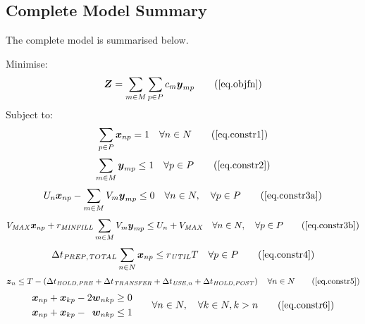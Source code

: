 \subsection{Complete Model Summary}\label{SS.completesummary}

The complete model is summarised below.

Minimise:
\begin{equation}
    \boldsymbol{Z} = \sum_{m \in M} \sum_{p \in P} c_m \boldsymbol{y}_{mp}
    \tag{\ref{eq.objfn}}
\end{equation}
Subject to:
\begin{equation}
    \sum_{p \in P} \boldsymbol{x}_{np} = 1 \quad \forall n \in N
    \tag{\ref{eq.constr1}}
\end{equation}
\begin{equation}
    \sum_{m \in M} \boldsymbol{y}_{mp} \le 1 \quad \forall p \in P
    \tag{\ref{eq.constr2}}
\end{equation}
\begin{equation}
    U_{n} \boldsymbol{x}_{np} - \sum_{m \in M} V_{m} \boldsymbol{y}_{mp} \le 0
    \quad \forall n \in N, \quad \forall p \in P
    \tag{\ref{eq.constr3a}}
\end{equation}
\begin{equation}
    V_{\mathit{MAX}} \boldsymbol{x}_{np} + r_{\mathit{MINFILL}} \sum_{m \in M}
    V_{m} \boldsymbol{y}_{mp} \le U_{n} + V_{\mathit{MAX}} \quad \forall n \in
    N, \quad \forall p \in P
    \tag{\ref{eq.constr3b}}
\end{equation}
\begin{equation}
    \Delta t_{\mathit{PREP,TOTAL}} \sum_{n \in N} \boldsymbol{x}_{np} \le 
    r_{\mathit{UTIL}} T \quad \forall p \in P
    \tag{\ref{eq.constr4}}
\end{equation}
\begin{equation}
    \boldsymbol{z}_{n} \le T - \left( \Delta t_{\mathit{HOLD,PRE}} +
    \Delta t_{\mathit{TRANSFER}} + \Delta t_{\mathit{USE},n} + \Delta
    t_{\mathit{HOLD,POST}} \right) \quad \forall n \in N
    \tag{\ref{eq.constr5}}
\end{equation}
\begin{equation}
    \begin{split}
        \begin{alignedat}{3}
            \boldsymbol{x}_{np} & {}+{} & \boldsymbol{x}_{kp} & {}-{} & 2
            \boldsymbol{w}_{nkp} & \ge 0\\
            \boldsymbol{x}_{np} & {}+{} & \boldsymbol{x}_{kp} & {}-{} &
            \boldsymbol{w}_{nkp} & \le 1\\
        \end{alignedat}
    \end{split}
    \quad\quad
    \begin{split}
        \forall n \in N, \quad \forall k \in N, k > n
    \end{split}
    \tag{\ref{eq.constr6}}
\end{equation}
